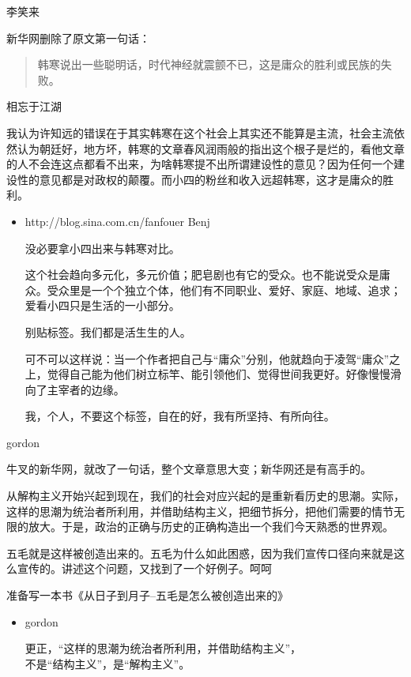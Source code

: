 李笑来

新华网删除了原文第一句话：

\begin{quote}
韩寒说出一些聪明话，时代神经就震颤不已，这是庸众的胜利或民族的失败。
\end{quote}

相忘于江湖

我认为许知远的错误在于其实韩寒在这个社会上其实还不能算是主流，社会主流依然认为朝廷好，地方坏，韩寒的文章春风润雨般的指出这个根子是烂的，看他文章的人不会连这点都看不出来，为啥韩寒提不出所谓建设性的意见？因为任何一个建设性的意见都是对政权的颠覆。而小四的粉丝和收入远超韩寒，这才是庸众的胜利。

\begin{itemize}[<+->]
\item
  http://blog.sina.com.cn/fanfouer Benj

  没必要拿小四出来与韩寒对比。

  这个社会趋向多元化，多元价值；肥皂剧也有它的受众。也不能说受众是庸众。受众里是一个个独立个体，他们有不同职业、爱好、家庭、地域、追求；爱看小四只是生活的一小部分。

  别贴标签。我们都是活生生的人。

  可不可以这样说：当一个作者把自己与``庸众''分别，他就趋向于凌驾``庸众''之上，觉得自己能为他们树立标竿、能引领他们、觉得世间我更好。好像慢慢滑向了主宰者的边缘。

  我，个人，不要这个标签，自在的好，我有所坚持、有所向往。
\end{itemize}

gordon

牛叉的新华网，就改了一句话，整个文章意思大变；新华网还是有高手的。

从解构主义开始兴起到现在，我们的社会对应兴起的是重新看历史的思潮。实际，这样的思潮为统治者所利用，并借助结构主义，把细节拆分，把他们需要的情节无限的放大。于是，政治的正确与历史的正确构造出一个我们今天熟悉的世界观。

五毛就是这样被创造出来的。五毛为什么如此困惑，因为我们宣传口径向来就是这么宣传的。讲述这个问题，又找到了一个好例子。呵呵

准备写一本书《从日子到月子--五毛是怎么被创造出来的》

\begin{itemize}[<+->]
\item
  gordon

  更正，``这样的思潮为统治者所利用，并借助结构主义''，\\
  不是``结构主义''，是``解构主义''。
\end{itemize}

